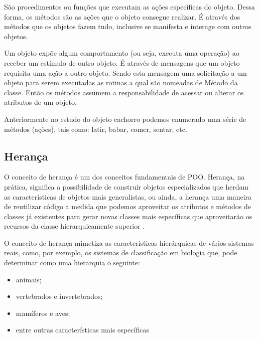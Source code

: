 São procedimentos ou funções que executam as ações específicas do objeto. 
Dessa forma, os métodos são as ações que o objeto consegue realizar. É 
através dos métodos que os objetos fazem tudo, inclusive se manifesta e 
interage com outros objetos.

Um objeto expõe algum comportamento (ou seja, executa uma operação) ao 
receber um estímulo de outro objeto. É através de mensagens que um objeto 
requisita uma ação a outro objeto. Sendo esta mensagem uma solicitação a um 
objeto para serem executadas as rotinas a qual são nomeadas de Método da 
classe. Então os métodos assumem a responsabilidade de acessar ou alterar os 
atributos de um objeto.

Anteriormente no estudo do objeto cachorro podemos enumerado uma série de métodos (ações), tais como: latir, babar, comer, sentar, etc.

\subsection{Herança}\label{subsection:heranca}

O conceito de herança é um dos conceitos fundamentais de POO. Herança, na prática, significa a possibilidade de construir objetos especializados que herdam as características de objetos mais generalistas, ou ainda, a herança uma maneira de reutilizar código a medida que podemos aproveitar os atributos e métodos de classes já existentes para gerar novas classes mais específicas que aproveitarão os recursos da classe hierarquicamente superior \cite{evandroeduardoseronruiz2008}.

O conceito de herança mimetiza as características hierárquicas de vários sistemas reais, como, por exemplo, os sistemas de classificação em biologia que, pode determinar como uma hierarquia o seguinte:

\begin{itemize}
    \item animais;
    \item vertebrados e invertebrados;
    \item mamíferos e aves;
    \item entre outras características mais específicas
\end{itemize}

